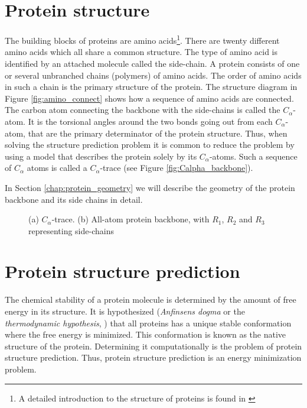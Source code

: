 \documentclass[10pt,a4paper,final,oneside,openany,article,twocolumn]{memoir}
\begin{document}
\section{Protein structure}
The building blocks of proteins are amino acids\footnote{A detailed
  introduction to the structure of proteins is found in
  \cite{branden}}. There are twenty different amino acids which all
share a common structure. The type of amino acid is identified by an
attached molecule called the side-chain. A protein consists of one or
several unbranched chains (polymers) of amino acids. The order of
amino acids in such a chain is the primary structure of the protein.
The structure diagram in Figure \ref{fig:amino_connect} shows how a
sequence of amino acids are connected. The carbon atom connecting the
backbone with the side-chains is called the $C_\alpha$-atom. It is the
torsional angles around the two bonds going out from each
$C_\alpha$-atom, that are the primary determinator of the protein
structure. Thus, when solving the structure prediction problem it is
common  to reduce the problem by using a model that
describes the protein solely by its $C_\alpha$-atoms. Such a sequence
of $C_{\alpha}$ atoms is called a $C_{\alpha}$-trace (see Figure
\ref{fig:Calpha_backbone}).

In Section \ref{chap:protein_geometry} we will describe the geometry
of the protein backbone and its side chains in detail.



\begin{figure}
  \centering
  \caption{(a) $C_{\alpha}$-trace. (b) All-atom protein backbone, with $R_1$, $R_2$ and $R_3$ representing side-chains}
\end{figure}

\section{Protein structure prediction}
The chemical stability of a protein molecule is determined by the
amount of free energy in its structure. It is hypothesized
(\textit{Anfinsens dogma} or the \textit{thermodynamic hypothesis},
\cite{anfinsen73, soundararajan2010}) that all proteins has a unique
stable conformation where the free energy is minimized. This
conformation is known as the native structure of the
protein. Determining it computationally is the problem of protein
structure prediction. Thus, protein structure prediction is an energy
minimization problem.
\end{document}
